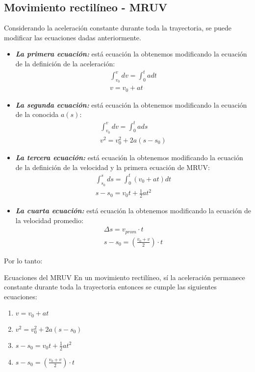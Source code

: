 \subsection*{Movimiento rectilíneo - MRUV}
Considerando la aceleración constante durante toda la trayectoria, se puede modificar las ecuaciones dadas anteriormente.
\begin{itemize}
	\item\textit{\textbf{ La primera ecuación: }} está ecuación la obtenemos modificando la ecuación de la definición de la aceleración:
	\begin{gather*}
		\int_{v_0}^{v}dv = \int_{0}^{t}a dt \\
		v=v_0+at
	\end{gather*}
	\item \textit{\textbf{La segunda ecuación:}} está ecuación la obtenemos modificando la ecuación de la conocida $a(s)$:
	\begin{gather*}
		\int_{v_0}^{v}dv=\int_{0}^{t}ads \\
		v^2=v_0^2+2a(s-s_0)
	\end{gather*}
	\item \textit{\textbf{La tercera ecuación:}} está ecuación la obtenemos modificando la ecuación de la definición de la velocidad y la primera ecuación de MRUV:
	\begin{gather*}
		\int_{s_0}^{s}ds=\int_{0}^{t}(v_0+at)dt \\
		s-s_0=v_0t+\frac{1}{2}at^2
	\end{gather*}
	\item \textit{\textbf{La cuarta ecuación:}} está ecuación la obtenemos modificando la ecuación de la velocidad promedio:
	\begin{gather*}
		\varDelta s = v_{prom}\cdot t \\
		s-s_0=\left(\frac{v_0+v}{2}\right)\cdot t
	\end{gather*}
\end{itemize}
Por lo tanto:
\begin{Theorem*} {Ecuaciones del MRUV}
	En un movimiento rectilíneo, sí la aceleración permanece constante durante toda la trayectoria entonces se cumple las siguientes ecuaciones:
	\begin{enumerate}
		\item $ v=v_0+at $
		\item $ v^2=v_0^2+2a(s-s_0) $
		\item $ s-s_0 = v_0t+\frac{1}{2}at^2 $
		\item $ s-s_0 = \left(\frac{v_0+v}{2}\right) \cdot t $
	\end{enumerate}
\end{Theorem*}